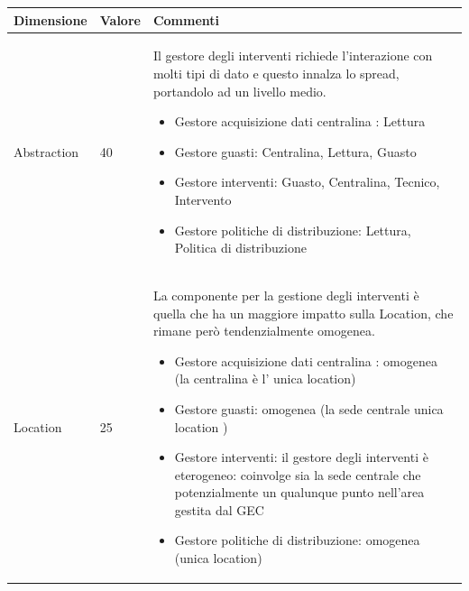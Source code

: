 \documentclass{beamer}
\begin{document}
\begin{frame}[allowframebreaks]
	
	
		\begin{center}
			\begin{table}
				\tiny
				\centering
				{\renewcommand{\arraystretch}{1.2}
					
					\begin{tabular}{|M{0.1\textwidth}|M{0.1\textwidth}|p{.6\textwidth}|}
						\hline
						Dimensione & Valore & Commenti \\
						\hline
						Abstraction & 40 & Il gestore degli interventi richiede l'interazione con molti tipi di dato e questo innalza lo spread, portandolo ad un livello medio.
						\begin{itemize}
							\item Gestore acquisizione dati centralina : Lettura
							\item Gestore guasti: Centralina, Lettura, Guasto
							\item Gestore interventi: Guasto, Centralina, Tecnico, Intervento
							\item Gestore politiche di distribuzione: Lettura, Politica di distribuzione
						\end{itemize} \\
						Location & 25 & La componente per la gestione degli interventi è quella che ha un maggiore impatto sulla Location, che rimane però tendenzialmente omogenea.
						\begin{itemize}
							\item Gestore acquisizione dati centralina : omogenea (la centralina è l' unica location)
							\item Gestore guasti:  omogenea (la sede centrale unica location )
							\item Gestore interventi: il gestore degli interventi è eterogeneo: coinvolge sia la sede centrale che potenzialmente un qualunque punto nell'area gestita dal GEC
							\item Gestore politiche di distribuzione:  omogenea (unica location)
						\end{itemize} \\
						\hline
				\end{tabular}}
			\end{table}
		\end{center}	
	\end{frame}	
\end{document}
